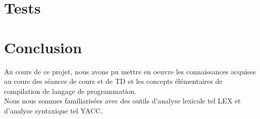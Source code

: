 \documentclass{article}
\begin{document}
\section{Tests}


\newpage
\section*{Conclusion}
Au cours de ce projet, nous avons pu mettre en oeuvre les connaissances acquises au cours des séances de cours et de TD et les concepts élémentaires de compilation de langage de programmation. \\

Nous nous sommes familiarisées avec des outils d'analyse lexicale tel LEX et d'analyse syntaxique tel YACC.
\end{document}
